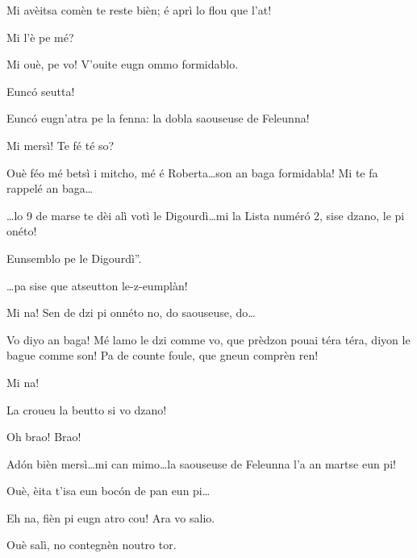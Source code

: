 \begin{drama}
 Mi avèitsa comèn te reste bièn; é aprì lo flou que l'at!

\Jeanspeaks Mi l'è pe mé?

\Cimaspeaks Mi ouè, pe vo! V'ouite eugn ommo formidablo.


\Marcospeaks Eunc\'o seutta!

\Cimaspeaks Eunc\'o eugn'atra pe la fenna: la dobla saouseuse de Feleunna!

\Jeanspeaks Mi mersì! Te fé té so?

\Cimaspeaks Ouè féo mé betsì i mitcho, mé é Roberta\ldots son an baga formidabla! Mi te fa rappelé an baga\ldots


\Cimaspeaks \ldots lo 9 de marse te dèi alì votì le Digourdì\ldots mi la Lista num\'er\'o 2, sise dzano, le pi onéto!


\Jeanspeaks {} \og Eunsemblo pe le Digourdì''.

\Marcospeaks \ldots pa sise que atseutton le-z-eumplàn!

\Cimaspeaks Mi na! Sen de dzi pi onnéto no, do saouseuse, do\ldots

\Jeanspeaks  Vo diyo an baga! Mé lamo le dzi comme vo, que prèdzon pouai téra téra, diyon le bague comme son! Pa de counte foule, que gneun comprèn ren!

\Cimaspeaks Mi na! 

\Jeanspeaks La croueu la beutto si vo dzano!

\CimaMarcospeaks Oh brao! Brao!

\Cimaspeaks Ad\'on bièn mersì\ldots mi can mimo\ldots la saouseuse de Feleunna l'a an martse eun pi!

\Jeanspeaks Ouè, èita t'isa eun boc\'on de pan eun pi\ldots

\Cimaspeaks Eh na, fièn pi eugn atro cou! Ara vo salio.

\Marcospeaks Ouè  salì, no contegnèn noutro tor.




\end{drama}

